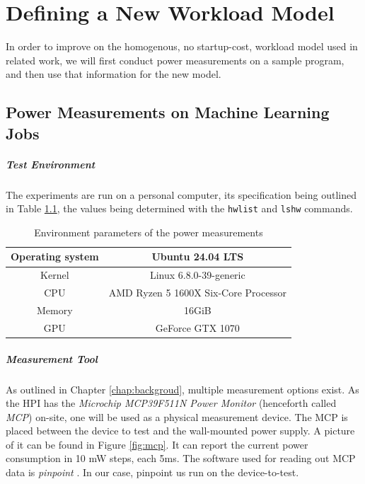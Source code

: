 \chapter{Defining a New Workload Model}

In order to improve on the homogenous, no startup-cost, workload model used in related work, we will first conduct power measurements on a sample program, and then use that information for the new model.

\section{Power Measurements on Machine Learning Jobs}
\label{sec:power_measurements}

\paragraph{Test Environment}

The experiments are run on a personal computer, its specification being outlined in Table \ref{tab:measurement_environment}, the values being determined with the \verb|hwlist| and \verb|lshw| commands.

\begin{table}[h!]
    \centering
    \begin{tabular}{|c|c|}
    \hline
        Operating system & Ubuntu 24.04 LTS \\ \hline
        Kernel & Linux 6.8.0-39-generic \\ \hline
        CPU & AMD Ryzen 5 1600X Six-Core Processor \\ \hline
        Memory & 16GiB \\ \hline
        GPU & GeForce GTX 1070 \\ \hline
    \end{tabular}
    \caption{Environment parameters of the power measurements}
\label{tab:measurement_environment}
\end{table}

\paragraph{Measurement Tool}

As outlined in Chapter \ref{chap:backgroud}, multiple measurement options exist. 
As the HPI has the \emph{Microchip MCP39F511N Power Monitor} (henceforth called \emph{MCP}) on-site, one will be used as a physical measurement device.
The MCP is placed between the device to test and the wall-mounted power supply. 
A picture of it can be found in Figure \ref{fig:mcp}. 
It can report the current power consumption in 10 mW steps, each 5ms. 
The software used for reading out MCP data is \emph{pinpoint} \cite{kohler_pinpoint_2020}.
In our case, pinpoint us run on the device-to-test.

